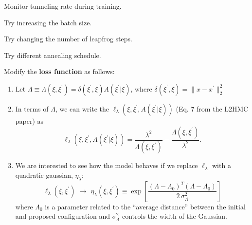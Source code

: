 \documentclass[11pt]{article}
\begin{document}
\begin{todolist}
    \item Monitor tunneling rate during training.
    \item Try increasing the batch size.
    \item Try changing the number of leapfrog steps.
    \item Try different annealing schedule.
    \item Modify the \textbf{loss function} as follows:
    \begin{enumerate}
        \item Let $\Lambda \equiv \Lambda(\xi, \xi^{\prime}) = \delta(\xi^{\prime},
            \xi) A(\xi^{\prime} | \xi)$, where $\delta(\xi^{\prime}, \xi) = \|x - x^{\prime}\|_{2}^{2}$
        \item In terms of $\Lambda$, we can write the
            $\ell_{\lambda}(\xi, \xi^{\prime}, A(\xi^{\prime}|\xi))$ (Eq. 7 from
            the L2HMC paper) as 
            \begin{equation}
                \ell_{\lambda}(\xi, \xi^{\prime}, A(\xi^{\prime}|\xi)) =
                    \frac{\lambda^{2}}{\Lambda(\xi, \xi^{\prime})} - \frac{\Lambda(\xi,
                    \xi^{\prime})}{\lambda^{2}}.
            \end{equation}
        \item We are interested to see how the model behaves if we replace
            $\ell_{\lambda}$ with a quadratic gaussian, $\eta_{\lambda}$:
            \begin{equation}
                \ell_{\lambda}{(\xi, \xi^{\prime})} 
                \,\,\longrightarrow \,\,\eta_{\lambda}(\xi, \xi^{\prime}) 
                    \equiv \exp\left[\frac{{(\Lambda -
                \Lambda_0)}^{T}{(\Lambda - \Lambda_0)}}{2\, \sigma_{\Lambda}^{2}}\right] 
            \end{equation}
            where $\Lambda_0$ is a parameter related to the ``average distance''
            between the initial and proposed configuration and
            $\sigma_{\Lambda}^{2}$ controls the width of the Gaussian.
      \end{enumerate}
\end{todolist}
    
\end{document}
